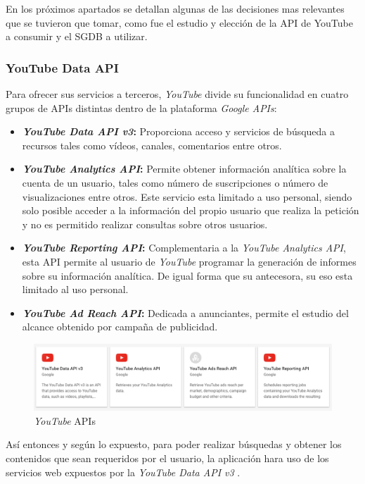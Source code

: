 \documentclass[11pt,a4paper]{article}
\begin{document}
En los próximos apartados se detallan algunas de las decisiones mas relevantes que se tuvieron que tomar, como fue el estudio y elección de la API de YouTube a consumir y el SGDB a utilizar. 
\medskip

\subsubsection{YouTube Data API}\label{youTubeDataAPI} 
Para ofrecer sus servicios a terceros, \textit{YouTube} divide su funcionalidad en cuatro grupos de APIs distintas dentro de la plataforma \textit{Google APIs}:

\begin{itemize}
\item \textbf{\textit{YouTube Data API v3}:} Proporciona acceso y servicios de búsqueda a recursos tales como vídeos, canales, comentarios entre otros.
\item \textbf{\textit{YouTube Analytics API}:} Permite obtener información analítica sobre la cuenta de un usuario, tales como número de suscripciones o número de visualizaciones entre otros. Este servicio esta limitado a uso personal, siendo solo posible acceder a la información del propio usuario que realiza la petición y no es permitido realizar consultas sobre otros usuarios.
\item \textbf{\textit{YouTube Reporting API}:} Complementaria a la \textit{YouTube Analytics API}, esta API permite al usuario de \textit{YouTube} programar la generación de informes sobre su información analítica. De igual forma que su antecesora, su eso esta limitado al uso personal.
\item \textbf{\textit{YouTube Ad Reach API}:} Dedicada a anunciantes, permite el estudio del alcance obtenido por campaña de publicidad.
\end{itemize}

\begin{figure}[H]
\centering
\includegraphics[scale=0.35]{desarrollo/youTubeAPI.png}
\caption{\textit{YouTube} APIs}
\end{figure}
\newpage 

Así entonces y según lo expuesto, para poder realizar búsquedas y obtener los contenidos que sean requeridos por el usuario, la aplicación hara uso de los servicios web expuestos por la \textit{YouTube Data API v3} \cite{29}.
\\
\end{document}
